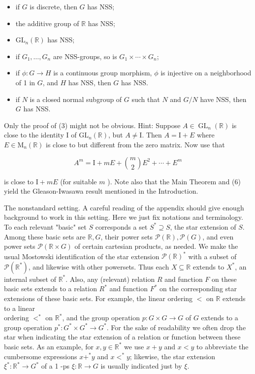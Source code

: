 \documentclass[10pt]{article}
\begin{document}
\begin{itemize}
  \item[(1)] if $G$ is discrete, then $G$ has NSS;
  \item[(2)] the additive group of $\mathbb{R}$ has NSS;
  \item[(3)] $\mathrm{GL}_{n}(\mathbb{R})$ has NSS;
  \item[(4)] if $G_{1}, \ldots, G_{n}$ are NSS-groups, so is $G_{1} \times \cdots \times G_{n}$;
  \item[(5)] if $\phi: G \rightarrow H$ is a continuous group morphism, $\phi$ is injective on a neighborhood of 1 in $G$, and $H$ has NSS, then $G$ has NSS.
  \item[(6)] if $N$ is a closed normal subgroup of $G$ such that $N$ and $G / N$ have NSS, then $G$ has NSS.
\end{itemize}

Only the proof of (3) might not be obvious. Hint: Suppose $A \in \operatorname{GL}_{n}(\mathbb{R})$ is close to the identity I of $\mathrm{GL}_{n}(\mathbb{R})$, but $A \neq \mathrm{I}$. Then $A=\mathrm{I}+E$ where $E \in \mathrm{M}_{n}(\mathbb{R})$ is close to but different from the zero matrix. Now use that

$$
A^{m}=\mathrm{I}+m E+\binom{m}{2} E^{2}+\cdots+E^{m}
$$

is close to $\mathrm{I}+m E$ (for suitable $m$ ). Note also that the Main Theorem and (6) yield the Gleason-Iwasawa result mentioned in the Introduction.

The nonstandard setting. A careful reading of the appendix should give enough background to work in this setting. Here we just fix notations and terminology. To each relevant "basic" set $S$ corresponds a set $S^{*} \supseteq S$, the star extension of $S$. Among these basic sets are $\mathbb{R}, G$, their power sets $\mathcal{P}(\mathbb{R}), \mathcal{P}(G)$, and even power sets $\mathcal{P}(\mathbb{R} \times G)$ of certain cartesian products, as needed. We make the usual Mostowski identification of the star extension $\mathcal{P}(\mathbb{R})^{*}$ with a subset of $\mathcal{P}\left(\mathbb{R}^{*}\right)$, and likewise with other powersets. Thus each $X \subseteq \mathbb{R}$ extends to $X^{*}$, an internal subset of $\mathbb{R}^{*}$. Also, any (relevant) relation $R$ and function $F$ on these basic sets extends to a relation $R^{*}$ and function $F^{*}$ on the corresponding star extensions of these basic sets. For example, the linear ordering $<$ on $\mathbb{R}$ extends to a linear\\
ordering $<^{*}$ on $\mathbb{R}^{*}$, and the group operation $p: G \times G \rightarrow G$ of $G$ extends to a group operation $p^{*}: G^{*} \times G^{*} \rightarrow G^{*}$. For the sake of readability we often drop the star when indicating the star extension of a relation or function between these basic sets. As an example, for $x, y \in \mathbb{R}^{*}$ we use $x+y$ and $x<y$ to abbreviate the cumbersome expressions $x+^{*} y$ and $x<^{*} y$; likewise, the star extension $\xi^{*}: \mathbb{R}^{*} \rightarrow G^{*}$ of a 1 -ps $\xi: \mathbb{R} \rightarrow G$ is usually indicated just by $\xi$.
\end{document}

